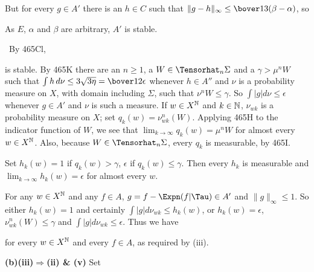 {\noindent But for every $g\in A'$ there is an $h\in C$ such that
$\|g-h\|_{\infty}\le\bover13(\beta-\alpha)$, so


\noindent As $E$, $\alpha$ and $\beta$ are arbitrary, $A'$ is stable.\
\Qed

\medskip

\quad\grheadc\ By 465Cl,


\noindent is stable.
By 465K there are an $n\ge 1$, a $W\in\Tensorhat_n\Sigma$
and a $\gamma>\mu^nW$ such that
$\int h\,d\nu\le 3\sqrt{3\eta}=\bover12\epsilon$
whenever $h\in A''$ and $\nu$ is a probability measure on $X$,
with domain including $\Sigma$, such that $\nu^nW\le\gamma$.   So
$\int|g|d\nu\le\epsilon$ whenever $g\in A'$ and $\nu$ is such a measure.
If $w\in X^{\Bbb N}$ and $k\in\Bbb N$,
$\nu_{wk}$ is a probability measure on $X$;  set
$q_k(w)=\nu_{wk}^n(W)$.
Applying 465H to the indicator function of $W$, we see that
$\lim_{k\to\infty}q_k(w)=\mu^nW$ for almost every $w\in X^{\Bbb N}$.
Also, because $W\in\Tensorhat_n\Sigma$, every $q_k$ is measurable, by
465I.

Set $h_k(w)=1$ if $q_k(w)>\gamma$, $\epsilon$ if $q_k(w)\le\gamma$.
Then every $h_k$ is measurable and $\lim_{k\to\infty}h_k(w)=\epsilon$
for almost every $w$.

For any $w\in X^{\Bbb N}$ and any $f\in A$, $g=f-\Expn(f|\Tau)\in A'$
and $\|g\|_{\infty}\le 1$.   So either $h_k(w)=1$ and certainly
$\int|g|d\nu_{wk}\le h_k(w)$, or $h_k(w)=\epsilon$,
$\nu_{wk}^n(W)\le\gamma$ and $\int|g|d\nu_{wk}\le\epsilon$.   Thus we
have


\noindent for every $w\in X^{\Bbb N}$ and every $f\in A$, as required by
(iii).

\medskip

{\bf (b)(iii)$\Rightarrow$(ii) \& (v)} Set



}
